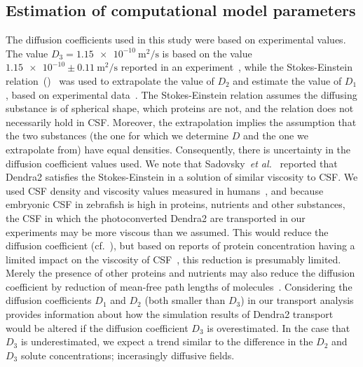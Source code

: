 \documentclass{WileyMSP-template}
\begin{document}
\subsection{Estimation of computational model parameters}
The diffusion coefficients used in this study were based on experimental values. 
The value $D_3=\num{1.15e-10} \ \mathrm{m^2/s}$
is based on the value $\num{1.15e-10} \pm 0.11 \ \mathrm{m^2/s}$ reported in an
experiment~\cite{GuraSadovsky2017MeasurementExpansion}, while the Stokes-Einstein
relation~()~\cite{Einstein1905UberTeilchen} was used to extrapolate
the value of $D_2$ and estimate the value of $D_1$, based on experimental
data~\cite{Swaminathan1997PhotobleachingDiffusion, Potma2001ReducedCells,
Mahmood2023ExosomeTemperature}. The Stokes-Einstein relation assumes the diffusing
substance is of spherical shape, which proteins are not, and the relation does not
necessarily hold in CSF. Moreover, the extrapolation implies the assumption that
the two substances (the one for which we determine $D$ and the one we extrapolate from)
have equal densities. Consequently, there is uncertainty in the diffusion coefficient values used.
We note that Sadovsky~\emph{et al.}~\cite{GuraSadovsky2017MeasurementExpansion} reported that
Dendra2 satisfies the Stokes-Einstein in a solution of similar viscosity
to CSF. We used CSF density and viscosity values measured in
humans~\cite{Bloomfield1998EffectsFluid},
and because embryonic CSF in zebrafish is high in proteins, nutrients and other substances,
the CSF in which the photoconverted Dendra2 are transported in our experiments may be more viscous
than we assumed. This would reduce the diffusion coefficient (cf.~),
but based on reports of protein concentration having a limited impact on the viscosity of
CSF~\cite{Bloomfield1998EffectsFluid, Brydon1995PhysicalViscosity}, this reduction is presumably
limited. Merely the presence of other proteins and nutrients may also reduce the diffusion
coefficient by reduction of mean-free path lengths of molecules~\cite{Cussler2009Diffusion:Systems}.
Considering the diffusion coefficients $D_1$ and $D_2$ (both smaller
than $D_3$) in our transport analysis provides information about how the simulation
results of Dendra2 transport would be altered if the
diffusion coefficient $D_3$ is overestimated. In the case that $D_3$ is underestimated, 
we expect a trend similar to the difference in the $D_2$ and $D_3$ solute concentrations;
incerasingly diffusive fields.
\end{document}
